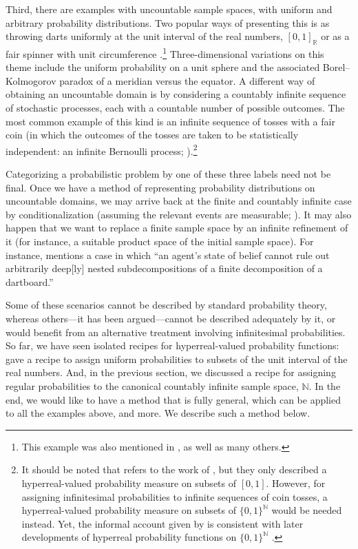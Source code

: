 Third, there are examples with uncountable sample spaces, with uniform and arbitrary probability distributions.
Two popular ways of presenting this is as throwing darts uniformly at the unit interval of the real numbers, $[0,1]_\mathbb{R}$ \citep[\textit{e.g.}, ][]{BernsteinWattenberg:1969} or as a fair spinner with unit circumference \citep[\textit{e.g.}, ][]{Skyrms:1995,Barrett:2010}.\footnote{This example was also mentioned in \citet{Lewis:1980}, as well as many others.} Three-dimensional variations on this theme include the uniform probability on a unit sphere and the associated Borel--Kolmogorov paradox of a meridian versus the equator.
A different way of obtaining an uncountable domain is by considering a countably infinite sequence of stochastic processes, each with a countable number of possible outcomes.
The most common example of this kind is an infinite sequence of tosses with a fair coin (in which the outcomes of the tosses are taken to be statistically independent: an infinite Bernoulli process; \citealp[\textit{e.g.}, ][]{Skyrms:1980,Williamson:2007,Weintraub:2008}).\footnote{It should be noted that \citet{Skyrms:1980} refers to the work of \citet{BernsteinWattenberg:1969}, but they only described a hyperreal-valued probability measure on subsets of $[0,1]$. However, for assigning infinitesimal probabilities to infinite sequences of coin tosses, a hyperreal-valued probability measure on subsets of $\{0,1\}^\mathbb{N}$ would be needed instead. Yet, the informal account given by \citet[pp.~30--31]{Skyrms:1980} is consistent with later developments of hyperreal probability functions on $\{0,1\}^\mathbb{N}$ \citep[see, \textit{e.g.}, ][]{Benci_etal:2013}.}

Categorizing a probabilistic problem by one of these three labels need not be final.
Once we have a method of representing probability distributions on uncountable domains, we may arrive back at the finite and countably infinite case by conditionalization (assuming the relevant events are measurable; \citealp[\textit{cf}.][]{Skyrms:1983a}).
It may also happen that we want to replace a finite sample space by an infinite refinement of it (for instance, a suitable product space of the initial sample space). For instance, \citet[p.~827]{Pedersen:2014a} mentions a case in which ``an agent's state of belief cannot rule out arbitrarily deep[ly] nested subdecompositions of a finite decomposition of a dartboard.''

Some of these scenarios cannot be described by standard probability theory, whereas others---it has been argued---cannot be described adequately by it, or would benefit from an alternative treatment involving infinitesimal probabilities.
So far, we have seen isolated recipes for hyperreal-valued probability functions: \citet{BernsteinWattenberg:1969} gave a recipe to assign uniform probabilities to subsets of the unit interval of the real numbers. And, in the previous section, we discussed a recipe for assigning regular probabilities to the canonical countably infinite sample space, $\mathbb{N}$.
In the end, we would like to have a method that is fully general, which can be applied to all the examples above, and more. We describe such a method below.

